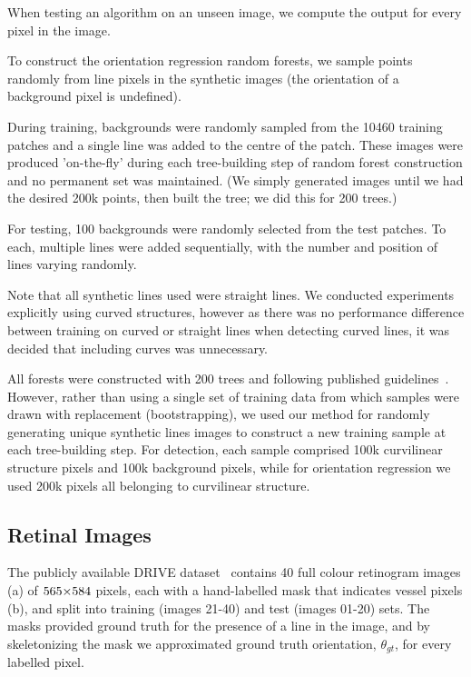 When testing an algorithm on an unseen image, we compute the output for every pixel in the image.

To construct the orientation regression random forests, we sample points randomly from line pixels in the synthetic images (the orientation of a background pixel is undefined).

During training, backgrounds were randomly sampled from the 10460 training patches and a single line was added to the centre of the patch. These images were produced 'on-the-fly' during each tree-building step of random forest construction and no permanent set was maintained. (We simply generated images until we had the desired 200k points, then built the tree; we did this for 200 trees.)

For testing, 100 backgrounds were randomly selected from the test patches. To each, multiple lines were added sequentially, with the number and position of lines varying randomly.

Note that all synthetic lines used were straight lines. We conducted experiments explicitly using curved structures, however as there was no performance difference between training on curved or straight lines when detecting curved lines, it was decided that including curves was unnecessary.

All forests were constructed with 200 trees and following published guidelines~\cite{Breiman_ML01}. However, rather than using a single set of training data from which samples were drawn with replacement (\ie bootstrapping), we used our method for randomly generating unique synthetic lines images to construct a new training sample at each tree-building step. For detection, each sample comprised 100k curvilinear structure pixels and 100k background pixels, while for orientation regression we used 200k pixels all belonging to curvilinear structure. 


\subsection{Retinal Images}
The publicly available DRIVE dataset~\cite{Staal_etal_TMI04} contains 40 full colour retinogram images (a) of $565 {\times} 584$ pixels, each with a hand-labelled mask that indicates vessel pixels (b), and split into training (images 21-40) and test (images 01-20) sets. The masks provided ground truth for the presence of a line in the image, and by skeletonizing the mask we approximated ground truth orientation, $\theta_{gt}$, for every labelled pixel.

